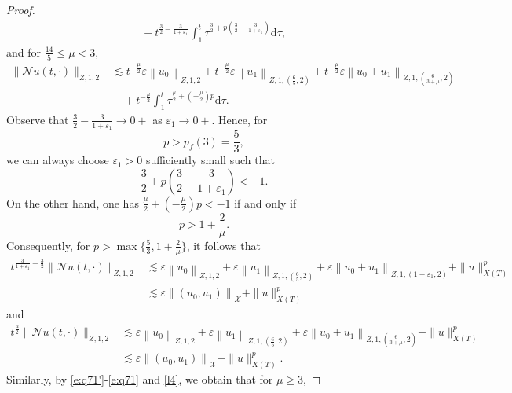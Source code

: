 \documentclass[11pt,twoside]{article}
\newcommand{\ve}{\varepsilon}
\newcommand{\f}{\frac}
\theoremstyle{plain}
\theoremstyle{definition}
\theoremstyle{remark}
\numberwithin{equation}{section}
\begin{document}
\begin{proof}
\begin{equation}
\begin{aligned}
&\quad+ t^{\f32-\f{3}{1+\ve_1}}\int_{1}^{t} \tau^{\f32+p(\f32-\f{3}{1+\ve_1})}\mathrm{d}\tau,
\end{aligned}
\end{equation}
and for $\f{14}{5}\leq\mu<3$,
\begin{equation}\label{Q25'}
\begin{aligned}
\|\mathcal{N} u(t, \cdot)\|_{Z, 1, 2} &\lesssim t^{-\f{\mu}{2}}\ve\left\|u_0\right\|_{Z, 1, 2}
+t^{-\f{\mu}{2}}\ve\left\|u_1\right\|_{Z, 1,(\f65, 2)}
+t^{-\f{\mu}{2}}\ve\left\|u_0+u_1\right\|_{Z, 1,(\f{6}{3+\mu}, 2)}\\
&\quad+ t^{-\f{\mu}{2}}\int_{1}^{t} \tau^{\f{\mu}{2}+(-\f{\mu}{2})p}\mathrm{d}\tau.
\end{aligned}
\end{equation}
Observe that $\f32-\f{3}{1+\ve_1}\rightarrow 0+$  as $\varepsilon_1\rightarrow0+$. Hence, for \begin{equation}\label{crit-1}
p>p_f(3)=\f53,
\end{equation}
we can always choose $\varepsilon_1>0$ sufficiently small such that
$$
\f32+p (\f32-\f{3}{1+\ve_1})<-1.
$$
On the other hand, one has $\f{\mu}{2}+(-\f{\mu}{2})p<-1$ if and only if
\begin{equation}\label{crit}
p>1+\f{2}{\mu}.
\end{equation}
Consequently,  for $p>\max\{\f53, 1+\f{2}{\mu}\}$, it follows that
\begin{equation}\label{Q26}
\begin{aligned}
t^{\f{3}{1+\ve_1}-\f32}\|\mathcal{N} u(t, \cdot)\|_{Z, 1, 2} &\lesssim \ve\left\|u_0\right\|_{Z, 1, 2}
+\ve\left\|u_1\right\|_{Z, 1,(\f65, 2)}+\ve\left\|u_0+u_1\right\|_{Z, 1,(1+\varepsilon_1, 2)}+ \|u\|_{X(T)}^p\\
& \lesssim \ve\left\|\left(u_{0}, u_{1}\right)\right\|_{\mathcal{X}}+ \|u\|_{X(T)}^p
\end{aligned}
\end{equation}
and
\begin{equation}\label{Q26'}
\begin{aligned}
t^{\f{\mu}{2}}\|\mathcal{N} u(t, \cdot)\|_{Z, 1, 2} &\lesssim \ve\left\|u_0\right\|_{Z, 1, 2}
+\ve\left\|u_1\right\|_{Z, 1,(\f65, 2)}+\ve\left\|u_0+u_1\right\|_{Z, 1,(\f{6}{3+\mu}, 2)}+ \|u\|_{X(T)}^p\\
& \lesssim \ve\left\|\left(u_{0}, u_{1}\right)\right\|_{\mathcal{X}}+ \|u\|_{X(T)}^p.
\end{aligned}
\end{equation}
Similarly, by \eqref{e:q71'}-\eqref{e:q71} and \eqref{l4}, we obtain that for $\mu\geq3$,

\end{proof}
\end{document}
